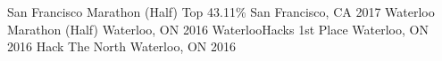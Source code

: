 \begin{cvhonors}
  \cvhonor
    {San Francisco Marathon (Half)}
    {Top 43.11\%}
    {San Francisco, CA}
    {2017}
  \cvhonor
    {Waterloo Marathon (Half)}
    {}
    {Waterloo, ON}
    {2016}
  \cvhonor
    {WaterlooHacks}
    {1st Place}
    {Waterloo, ON}
    {2016}
  \cvhonor
    {Hack The North}
    {}
    {Waterloo, ON}
    {2016}
\end{cvhonors}
